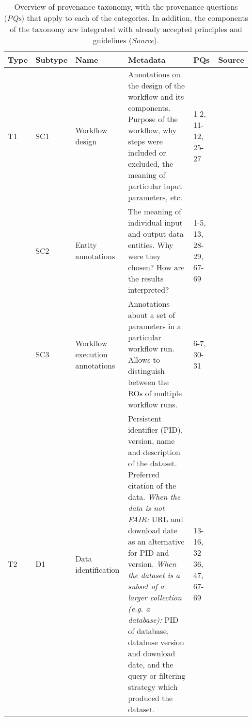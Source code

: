 \begin{table*}
\caption{Overview of provenance taxonomy, with the provenance questions (\emph{PQs}) that apply to each of the categories. In addition, the components of the taxonomy are integrated with already accepted principles and guidelines (\emph{Source}).
}\label{tab:taxonomy}

\begin{tabularx}{\linewidth}{p{0.1in}p{0.3in}p{1.3in}Lp{0.45in}p{0.3in}} %
\toprule
{Type} & {Subtype} & {Name} & {Metadata}  & {PQs} & {Source} \\
\midrule
T1  & {SC1}\label{tax:sc1}   & Workflow design  & Annotations on the design of the workflow and its components. Purpose of the workflow, why steps were included or excluded, the meaning of particular input parameters, etc.    & 1-2, 11-12, 25-27    & \citep{committeeonreproducibilityandreplicabilityinscienceReproducibilityReplicabilityScience2019,belhajjameResearchObjectSuite2014,grykWorkflowsProvenanceInformation2017,stoddenEnhancingReproducibilityComputational2016}   \\
    & SC2   & Entity annotations                & The meaning of individual input and output data entities. Why were they chosen? How are the results interpreted?          & 1-5, 13, 28-29, 67-69  &   \\
    & SC3   & Workflow execution annotations    & Annotations about a set of parameters in a particular workflow run. Allows to distinguish between the ROs of multiple workflow runs.             & 6-7, 30-31 &  \\
\midrule
T2  & D1    & Data identification               & Persistent identifier (PID), version, name and description of the dataset. Preferred citation of the data. \emph{When the data is not FAIR:} URL and download date as an alternative for PID and version. \emph{When the dataset is a subset of a larger collection (e.g. a database):} PID of database, database version and download date, and the query or filtering strategy which produced the dataset.    & 13-16, 32-36, 47, 67-69 & \citep{datacitationsynthesisgroupJointDeclarationData2014} \\

\end{tabularx}
\end{table*}
